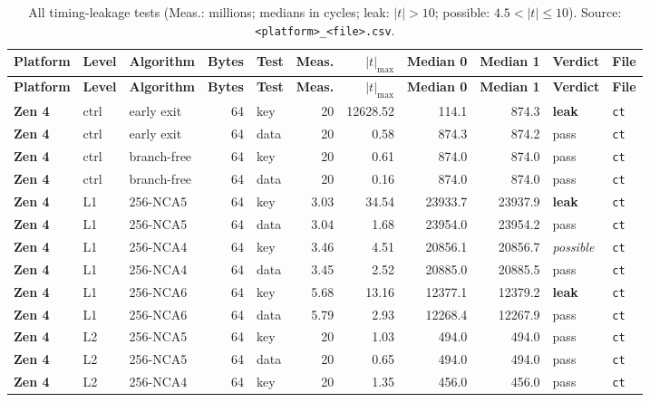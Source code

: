 {\scriptsize\setlength{\tabcolsep}{3.5pt}
\begin{longtable}{@{}>{\bfseries}l l l r l r r r r l l@{}}
\caption{All timing-leakage tests (Meas.: millions; medians in cycles; leak: $|t| > 10$; possible: $4.5 < |t| \le 10$). Source: \texttt{<platform>\_<file>.csv}.}
\label{tab:s-ct}\\
\toprule
\textbf{Platform} & \textbf{Level} & \textbf{Algorithm} & \textbf{Bytes} & \textbf{Test} & \textbf{Meas.} & \textbf{$|t|_{\max}$} & \textbf{Median 0} & \textbf{Median 1} & \textbf{Verdict} & \textbf{File} \\
\midrule
\endfirsthead
\toprule
\textbf{Platform} & \textbf{Level} & \textbf{Algorithm} & \textbf{Bytes} & \textbf{Test} & \textbf{Meas.} & \textbf{$|t|_{\max}$} & \textbf{Median 0} & \textbf{Median 1} & \textbf{Verdict} & \textbf{File} \\
\midrule
\endhead
Zen 4 & ctrl & early exit & 64 & key & 20 & 12628.52 & 114.1 & 874.3 & \textbf{leak} & \texttt{ct} \\
Zen 4 & ctrl & early exit & 64 & data & 20 & 0.58 & 874.3 & 874.2 & pass & \texttt{ct} \\
Zen 4 & ctrl & branch-free & 64 & key & 20 & 0.61 & 874.0 & 874.0 & pass & \texttt{ct} \\
Zen 4 & ctrl & branch-free & 64 & data & 20 & 0.16 & 874.0 & 874.0 & pass & \texttt{ct} \\
Zen 4 & L1 & 256-NCA5 & 64 & key & 3.03 & 34.54 & 23933.7 & 23937.9 & \textbf{leak} & \texttt{ct} \\
Zen 4 & L1 & 256-NCA5 & 64 & data & 3.04 & 1.68 & 23954.0 & 23954.2 & pass & \texttt{ct} \\
Zen 4 & L1 & 256-NCA4 & 64 & key & 3.46 & 4.51 & 20856.1 & 20856.7 & \emph{possible} & \texttt{ct} \\
Zen 4 & L1 & 256-NCA4 & 64 & data & 3.45 & 2.52 & 20885.0 & 20885.5 & pass & \texttt{ct} \\
Zen 4 & L1 & 256-NCA6 & 64 & key & 5.68 & 13.16 & 12377.1 & 12379.2 & \textbf{leak} & \texttt{ct} \\
Zen 4 & L1 & 256-NCA6 & 64 & data & 5.79 & 2.93 & 12268.4 & 12267.9 & pass & \texttt{ct} \\
Zen 4 & L2 & 256-NCA5 & 64 & key & 20 & 1.03 & 494.0 & 494.0 & pass & \texttt{ct} \\
Zen 4 & L2 & 256-NCA5 & 64 & data & 20 & 0.65 & 494.0 & 494.0 & pass & \texttt{ct} \\
Zen 4 & L2 & 256-NCA4 & 64 & key & 20 & 1.35 & 456.0 & 456.0 & pass & \texttt{ct} \\

\end{longtable}}
